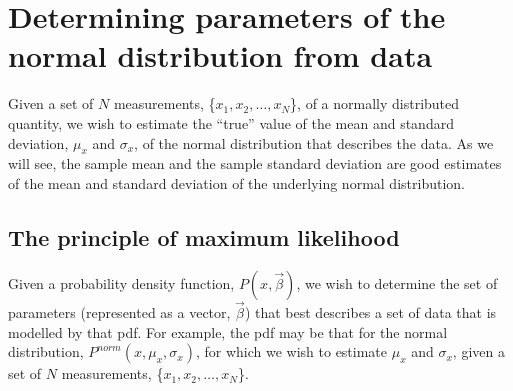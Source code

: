 \section{Determining parameters of the normal distribution from data}
Given a set of $N$ measurements, \{$x_1, x_2, \dots, x_N$\}, of a normally distributed quantity, we wish to estimate the ``true'' value of the mean and standard deviation, $\mu_x$ and $\sigma_x$, of the normal distribution that describes the data. As we will see, the sample mean and the sample standard deviation are good estimates of the mean and standard deviation of the underlying normal distribution.

\subsection{The principle of maximum likelihood}
Given a probability density function, $P(x,\vec\beta)$, we wish to determine the set of parameters (represented as a vector, $\vec\beta$) that best describes a set of data that is modelled by that pdf.  For example, the pdf may be that for the normal distribution, $P^{norm}(x,\mu_x,\sigma_x)$, for which we wish to estimate $\mu_x$ and $\sigma_x$, given a set of $N$ measurements, \{$x_1, x_2, \dots,x_N$\}.

